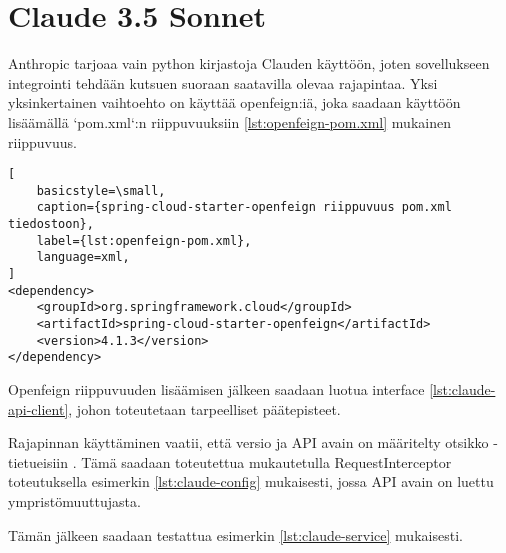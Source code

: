 

\section{Claude 3.5 Sonnet}

Anthropic tarjoaa vain python kirjastoja Clauden käyttöön, joten sovellukseen
integrointi tehdään kutsuen suoraan saatavilla olevaa rajapintaa. Yksi
yksinkertainen vaihtoehto on käyttää openfeign:iä, joka saadaan käyttöön
lisäämällä `pom.xml`:n riippuvuuksiin \ref{lst:openfeign-pom.xml} mukainen
riippuvuus.

\begin{lstlisting}[
    basicstyle=\small,
    caption={spring-cloud-starter-openfeign riippuvuus pom.xml tiedostoon},
    label={lst:openfeign-pom.xml},
    language=xml,
]
<dependency>
    <groupId>org.springframework.cloud</groupId>
    <artifactId>spring-cloud-starter-openfeign</artifactId>
    <version>4.1.3</version>
</dependency>
\end{lstlisting}

Openfeign riippuvuuden lisäämisen jälkeen saadaan luotua interface
\ref{lst:claude-api-client}, johon toteutetaan tarpeelliset päätepisteet.



Rajapinnan käyttäminen vaatii, että versio ja API avain on määritelty otsikko
-tietueisiin \parencite{anthropicAPIDocsVersions}
\parencite{anthropicAPIDocsGettingStarted}. Tämä saadaan toteutettua
mukautetulla RequestInterceptor toteutuksella esimerkin \ref{lst:claude-config}
mukaisesti, jossa API avain on luettu ympristömuuttujasta.



Tämän jälkeen saadaan testattua esimerkin \ref{lst:claude-service} mukaisesti.


